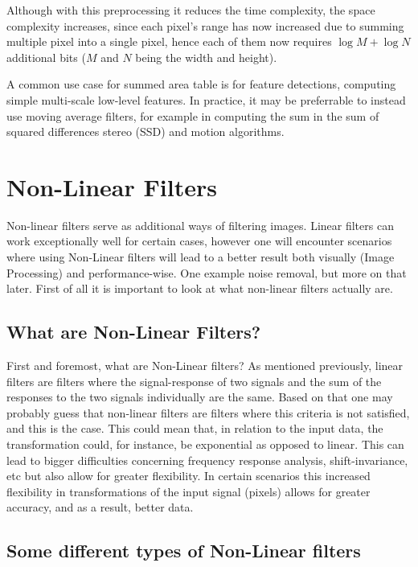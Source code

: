 \documentclass[twoside,a4paper,article]{combine}
\begin{document}
Although with this preprocessing it reduces the time complexity, the space complexity increases, since each pixel's range has now increased due to summing multiple pixel into a single pixel,
hence each of them now requires $\log M + \log N$ additional bits ($M$ and $N$ being the width and height)\cite{Szeliski_2022}.

A common use case for summed area table is for feature detections, computing simple multi-scale low-level features. In practice, it may be preferrable to instead use 
moving average filters, for example in computing the sum in the sum of squared differences stereo (SSD) and motion algorithms\cite{Szeliski_2022}.\footnotemark{}
 


\section{Non-Linear Filters}
Non-linear filters serve as additional ways of filtering images. Linear filters can work exceptionally well for certain cases, however one will encounter scenarios where using Non-Linear filters will lead to a better result both visually (Image Processing) and performance-wise. One example noise removal, but more on that later. First of all it is important to look at what non-linear filters actually are.

\subsection{What are Non-Linear Filters?}
First and foremost, what are Non-Linear filters? As mentioned previously, linear filters are filters where the signal-response of two signals and the sum of the responses to the two signals individually are the same. Based on that one may probably guess that non-linear filters are filters where this criteria is not satisfied, and this is the case. This could mean that, in relation to the input data, the transformation could, for instance, be exponential as opposed to linear. This can lead to bigger difficulties concerning frequency response analysis,\cite[p.~132]{szeliski} shift-invariance, etc but also allow for greater flexibility. In certain scenarios this increased flexibility in transformations of the input signal (pixels) allows for greater accuracy, and as a result, better data.
\subsection{Some different types of Non-Linear filters}
\end{document}
